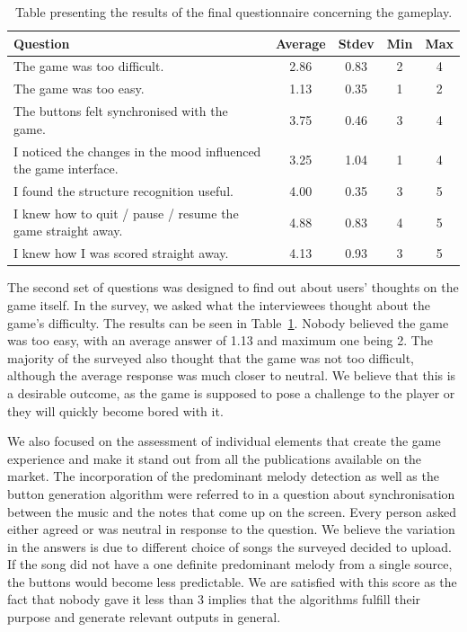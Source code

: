 \begin{table}
\begin{center}
\begin{tabular}{| p{8cm} | c | c | c | c | } 																			   \hline 
 \textbf{Question} & \textbf{Average} & \textbf{Stdev} & \textbf{Min} & \textbf{Max }	\\ \hline \hline
 The game was too difficult. 														& 2.86 & 0.83 & 2 & 4 \\ \hline		
 The game was too easy. 															& 1.13 & 0.35 & 1 & 2  \\ \hline
 The buttons felt synchronised with the game. 								& 3.75 & 0.46 & 3 & 4	 \\ \hline
 I noticed the changes in the mood influenced the game interface.	& 3.25 & 1.04 & 1 & 4	 \\ \hline
 I found the structure recognition useful.										& 4.00 & 0.35 & 3 & 5  \\ \hline
 I knew how to quit / pause / resume the game straight away.			& 4.88 & 0.83 & 4 & 5	 \\ \hline
 I knew how I was scored straight away.										& 4.13 & 0.93 & 3 & 5	 \\ \hline
 \end{tabular}
\caption{Table presenting the results of the final questionnaire concerning the gameplay.}
\label{table:finalquestionsgameplay}
\end{center}
\end{table}

The second set of questions was designed to find out about users' thoughts on the game itself. In the survey, we asked what the interviewees thought about the game's difficulty. The results can be seen in Table~\ref{table:finalquestionsgameplay}. Nobody believed the game was too easy, with an average answer of 1.13 and maximum one being 2. The majority of the surveyed also thought that the game was not too difficult, although the average response was much closer to neutral. We believe that this is a desirable outcome, as the game is supposed to pose a challenge to the player or they will quickly become bored with it. 

We also focused on the assessment of individual elements that create the game experience and make it stand out from all the publications available on the market. The incorporation of the predominant melody detection as well as the button generation algorithm were referred to in a question about synchronisation between the music and the notes that come up on the screen. Every person asked either agreed or was neutral in response to the question. We believe the variation in the answers is due to different choice of songs the surveyed decided to upload. If the song did not have a one definite predominant melody from a single source, the buttons would become less predictable. 
We are satisfied with this score as the fact that nobody gave it less than 3 implies that the algorithms fulfill their purpose and generate relevant outputs in general.

